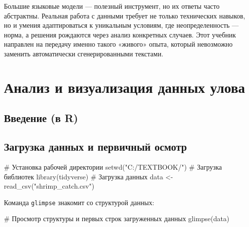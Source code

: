 \documentclass[
  letterpaper,
  DIV=11,
  numbers=noendperiod]{scrreprt}
\newenvironment{Shaded}{\begin{snugshade}}{\end{snugshade}}
\newcommand{\CommentTok}[1]{\textcolor[rgb]{0.37,0.37,0.37}{#1}}
\newcommand{\FunctionTok}[1]{\textcolor[rgb]{0.28,0.35,0.67}{#1}}
\newcommand{\NormalTok}[1]{\textcolor[rgb]{0.00,0.23,0.31}{#1}}
\newcommand{\OtherTok}[1]{\textcolor[rgb]{0.00,0.23,0.31}{#1}}
\newcommand{\StringTok}[1]{\textcolor[rgb]{0.13,0.47,0.30}{#1}}
\begin{document}
Большие языковые модели --- полезный инструмент, но их ответы часто
абстрактны. Реальная работа с данными требует не только технических
навыков, но и умения адаптироваться к уникальным условиям, где
неопределенность --- норма, а решения рождаются через анализ конкретных
случаев. Этот учебник направлен на передачу именно такого «живого»
опыта, который невозможно заменить автоматически сгенерированными
текстами.


\chapter{Анализ и визуализация данных
улова}\label{ux430ux43dux430ux43bux438ux437-ux438-ux432ux438ux437ux443ux430ux43bux438ux437ux430ux446ux438ux44f-ux434ux430ux43dux43dux44bux445-ux443ux43bux43eux432ux430}

\section{Введение (в
R)}\label{ux432ux432ux435ux434ux435ux43dux438ux435-ux432-r}

\section{Загрузка данных и первичный
осмотр}\label{ux437ux430ux433ux440ux443ux437ux43aux430-ux434ux430ux43dux43dux44bux445-ux438-ux43fux435ux440ux432ux438ux447ux43dux44bux439-ux43eux441ux43cux43eux442ux440}

\begin{Shaded}
\begin{Highlighting}[]
\CommentTok{\# Установка рабочей директории}
\FunctionTok{setwd}\NormalTok{(}\StringTok{"C:/TEXTBOOK/"}\NormalTok{)}
\CommentTok{\# Загрузка библиотек}
\FunctionTok{library}\NormalTok{(tidyverse)}
\CommentTok{\# Загрузка данных}
\NormalTok{data }\OtherTok{\textless{}{-}} \FunctionTok{read\_csv}\NormalTok{(}\StringTok{"shrimp\_catch.csv"}\NormalTok{)}
\end{Highlighting}
\end{Shaded}

Команда \texttt{glimpse} знакомит со структурой данных:

\begin{Shaded}
\begin{Highlighting}[]
\CommentTok{\# Просмотр структуры и первых строк загруженных данных}
\FunctionTok{glimpse}\NormalTok{(data)}
\end{Highlighting}
\end{Shaded}
\end{document}
